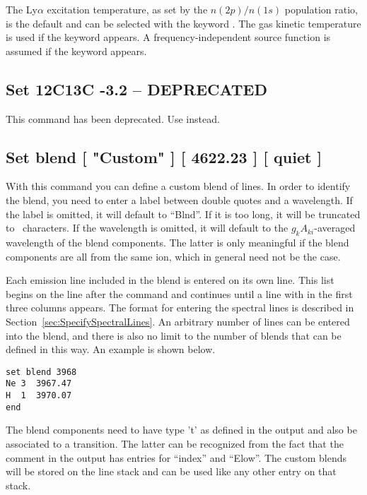The Ly$\alpha$ excitation temperature, as set by the $n(2p)/n(1s)$ population ratio, is the default
and can be selected with the keyword .
The gas kinetic temperature is used if the keyword  appears.
A frequency-independent source function is assumed if the keyword  appears.

\subsection{Set 12C13C -3.2 -- DEPRECATED}

This command has been deprecated.
Use  instead.

\subsection{Set blend [ "Custom" ] [ 4622.23 ] [ quiet ]}

With this command you can define a custom blend of lines. In order to identify
the blend, you need to enter a label between double quotes and a wavelength.
If the label is omitted, it will default to ``Blnd''. If it is too long, it
will be truncated to \LabelLenMax\ characters. If the wavelength is omitted,
it will default to the $g_k A_{ki}$-averaged wavelength of the blend
components. The latter is only meaningful if the blend components are all from
the same ion, which in general need not be the case.

Each emission line included in the blend is entered on its own line. This list
begins on the line after the  command and continues until
a line with  in the first three columns appears. The format for
entering the spectral lines is described in
Section~\ref{sec:SpecifySpectralLines}. An arbitrary number of lines can be
entered into the blend, and there is also no limit to the number of blends
that can be defined in this way. An example is shown below.
\begin{verbatim}
set blend 3968
Ne 3  3967.47
H  1  3970.07
end
\end{verbatim}

The blend components need to have type 't' as defined in the  output and also be associated to a transition. The latter can
be recognized from the fact that the comment in the  output has entries for ``index'' and ``Elow''. The custom blends
will be stored on the line stack and can be used like any other entry on that
stack.


